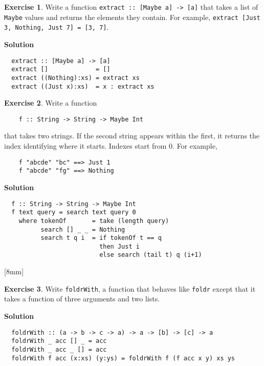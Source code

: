 \documentclass[11pt,a4paper]{article}
\theoremstyle{definition}
\newtheorem{exr}{Exercise}
\begin{document}
\begin{exr}
  Write a function \texttt{extract :: [Maybe a] -> [a]} that takes a list of 
  \texttt{Maybe} values and returns the elements they contain. For example, 
  \texttt{extract [Just 3, Nothing, Just 7] = [3, 7]}.
\end{exr}

\textbf{Solution}
\begin{lstlisting}
  extract :: [Maybe a] -> [a]
  extract []             = []
  extract ((Nothing):xs) = extract xs
  extract ((Just x):xs)  = x : extract xs
\end{lstlisting}


\newpage

\begin{exr}
  Write a function

  \begin{lstlisting}
    f :: String -> String -> Maybe Int
  \end{lstlisting}

  that takes two strings. If the second string appears within the first, 
  it returns the index identifying where it starts. Indexes start from 0. 
  For example,

  \begin{lstlisting}
    f "abcde" "bc" ==> Just 1
    f "abcde" "fg" ==> Nothing
  \end{lstlisting}
\end{exr}

\textbf{Solution}
\begin{lstlisting}
  f :: String -> String -> Maybe Int
  f text query = search text query 0
    where tokenOf       = take (length query)
          search [] _ _ = Nothing
          search t q i  = if tokenOf t == q
                          then Just i
                          else search (tail t) q (i+1)
\end{lstlisting}


\vspace{5mm}
[8mm]

\begin{exr}
  Write \texttt{foldrWith}, a function that behaves like \texttt{foldr} except 
  that it takes a function of three arguments and two lists.
\end{exr}

\textbf{Solution}
\begin{lstlisting}
  foldrWith :: (a -> b -> c -> a) -> a -> [b] -> [c] -> a
  foldrWith _ acc [] _ = acc
  foldrWith _ acc _ [] = acc
  foldrWith f acc (x:xs) (y:ys) = foldrWith f (f acc x y) xs ys
\end{lstlisting}
\end{document}
